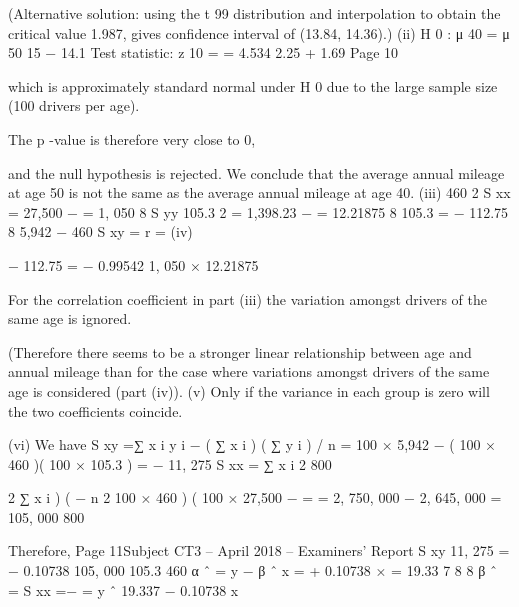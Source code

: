 \documentclass[a4paper,12pt]{article}
\begin{document}
(Alternative solution: using the t 99 distribution and interpolation to obtain the
critical value 1.987, gives confidence interval of (13.84, 14.36).)
(ii)
H 0 : μ 40 =
μ 50
15 − 14.1
Test
statistic: z 10
=
= 4.534
2.25 + 1.69
Page 10

which is approximately standard normal under H 0 due to the large sample
size (100 drivers per age).

The p -value is therefore very close to 0,

and the null hypothesis is rejected. We conclude that the average annual
mileage at age 50 is not the same as the average annual mileage at age 40. 
(iii)
460 2
S xx = 27,500 −
= 1, 050
8
S yy
105.3 2
= 1,398.23 −
= 12.21875
8 
105.3
=
− 112.75
8 
5,942 − 460
S xy =
r =
(iv)

− 112.75
= − 0.99542
1, 050 × 12.21875

For the correlation coefficient in part (iii) the variation amongst drivers of the
same age is ignored.

(Therefore there seems to be a stronger linear relationship between age and
annual mileage than for the case where variations amongst drivers of the same
age is considered (part (iv)).
(v) Only if the variance in each group is zero will the two coefficients coincide.

(vi) We have
S xy =∑ x i y i − ( ∑ x i ) ( ∑ y i ) / n = 100 × 5,942 −
( 100 × 460 )( 100 × 105.3 )
= − 11, 275
S xx =
∑ x i 2
800

2
∑ x i )
(
−
n
2
100 × 460 )
(
100 × 27,500 −
=
= 2, 750, 000 − 2, 645, 000 = 105, 000
800

Therefore,
Page 11Subject CT3  – April 2018 – Examiners’ Report
S xy
11, 275
= − 0.10738
105, 000 
105.3
460
α ˆ = y − β ˆ x =
+ 0.10738 ×
= 19.33 7
8
8 
β ˆ =
S xx
=−
=
y ˆ 19.337 − 0.10738 x


\end{document}
